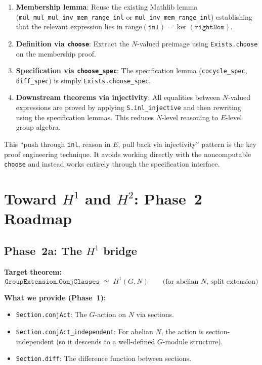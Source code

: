 \documentclass[11pt]{article}
\begin{document}
\begin{enumerate}[nosep]
\item \textbf{Membership lemma}: Reuse the existing Mathlib lemma
  (\texttt{mul\_mul\_mul\_inv\_mem\_range\_inl} or \texttt{mul\_inv\_mem\_range\_inl})
  establishing that the relevant expression lies in
  $\mathrm{range}(\texttt{inl}) = \ker(\texttt{rightHom})$.

\item \textbf{Definition via \texttt{choose}}: Extract the $N$-valued preimage using
  \texttt{Exists.choose} on the membership proof.

\item \textbf{Specification via \texttt{choose\_spec}}: The specification lemma
  (\texttt{cocycle\_spec}, \texttt{diff\_spec}) is simply \texttt{Exists.choose\_spec}.

\item \textbf{Downstream theorems via injectivity}: All equalities between $N$-valued
  expressions are proved by applying \texttt{S.inl\_injective} and then rewriting
  using the specification lemmas. This reduces $N$-level reasoning to $E$-level
  group algebra.
\end{enumerate}

This ``push through \texttt{inl}, reason in $E$, pull back via injectivity'' pattern
is the key proof engineering technique. It avoids working directly with the
noncomputable \texttt{choose} and instead works entirely through the specification
interface.

\section{\texorpdfstring{Toward $H^1$ and $H^2$: Phase~2 Roadmap}{Toward H1 and H2: Phase 2 Roadmap}}\label{sec:roadmap}

\subsection{\texorpdfstring{Phase~2a: The $H^1$ bridge}{Phase 2a: The H1 bridge}}

\textbf{Target theorem:}
\[
  \texttt{GroupExtension.ConjClasses} \;\simeq\; H^1(G, N)
  \qquad\text{(for abelian $N$, split extension)}
\]

\textbf{What we provide (Phase~1):}
\begin{itemize}[nosep]
\item \texttt{Section.conjAct}: The $G$-action on $N$ via sections.
\item \texttt{Section.conjAct\_independent}: For abelian $N$, the action is
  section-independent (so it descends to a well-defined $G$-module structure).
\item \texttt{Section.diff}: The difference function between sections.
\end{itemize}
\end{document}
